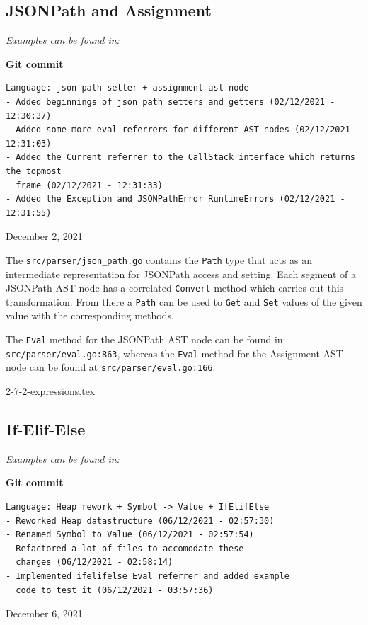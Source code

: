 \documentclass[]{full}
\theoremstyle{definition}
\begin{document}
\subsection{JSONPath and Assignment}

\textit{Examples can be found in: }

\begin{center}
    \textbf{Git commit}
    \begin{verbatim}
Language: json path setter + assignment ast node
- Added beginnings of json path setters and getters (02/12/2021 - 12:30:37)
- Added some more eval referrers for different AST nodes (02/12/2021 - 12:31:03)
- Added the Current referrer to the CallStack interface which returns the topmost
  frame (02/12/2021 - 12:31:33)
- Added the Exception and JSONPathError RuntimeErrors (02/12/2021 - 12:31:55)
    \end{verbatim}
    \vspace{-1em}
    \tiny{December 2, 2021}
\end{center}

The \verb|src/parser/json_path.go| contains the \verb|Path| type that acts as an intermediate representation for JSONPath access and setting. Each segment of a JSONPath AST node has a correlated \verb|Convert| method which carries out this transformation. From there a \verb|Path| can be used to \verb|Get| and \verb|Set| values of the given value with the corresponding methods.

The \verb|Eval| method for the JSONPath AST node can be found in: \verb|src/parser/eval.go:863|, whereas the \verb|Eval| method for the Assignment AST node can be found at \verb|src/parser/eval.go:166|.

{2-7-2-expressions.tex}


\subsection{If-Elif-Else}

\textit{Examples can be found in: }

\begin{center}
    \textbf{Git commit}
    \begin{verbatim}
Language: Heap rework + Symbol -> Value + IfElifElse
- Reworked Heap datastructure (06/12/2021 - 02:57:30)
- Renamed Symbol to Value (06/12/2021 - 02:57:54)
- Refactored a lot of files to accomodate these 
  changes (06/12/2021 - 02:58:14)
- Implemented ifelifelse Eval referrer and added example
  code to test it (06/12/2021 - 03:57:36)
    \end{verbatim}
    \vspace{-1em}
    \tiny{December 6, 2021}
\end{center}
\end{document}
